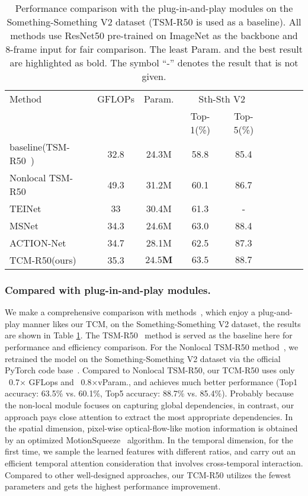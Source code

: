 \documentclass[journal]{IEEEtran}
\begin{document}
\begin{table}[!htbp]
\caption{Performance comparison with the plug-in-and-play modules on the Something-Something V2 dataset (TSM-R50 is used as a baseline). All methods use ResNet50 pre-trained on ImageNet as the backbone and 8-frame input for fair comparison. The least Param. and the best result are highlighted as bold. The symbol ``-” denotes the result that is not given.}
\label{tab:plugin}
\centering
\begin{tabular}{lcccccccc}
\hline
Method                           & GFLOPs & Param.           & \multicolumn{2}{c}{Sth-Sth V2}  \\
                                 &       &         & Top-1(\%)          & Top-5(\%)    \\ \hline
baseline(TSM-R50~\cite{lin2019tsm})            & 32.8    & 24.3M   & 58.8           & 85.4   \\ \hline
Nonlocal TSM-R50~\cite{lin2019tsm}           & 49.3    & 31.2M   & 60.1           & 86.7   \\
TEINet~\cite{liu2020teinet}      & 33  & 30.4M   & 61.3           & -                \\
MSNet~\cite{kwon2020motionsqueeze} & 34.3  & 24.6M   & 63.0   & 88.4 \\
ACTION-Net~\cite{wang2021action} & 34.7  & 28.1M   & 62.5   & 87.3 \\
TCM-R50(ours)  &     35.3  &   $\mathbf{24.5M}$        & $\mathbf{63.5}$           & $\mathbf{88.7}$                \\ \hline
\end{tabular}
\end{table}

\subsubsection{Compared with plug-in-and-play modules.}
We make a comprehensive comparison with methods~\cite{lin2019tsm,liu2020teinet,kwon2020motionsqueeze,wang2021action}, which enjoy a plug-and-play manner likes our TCM, on the Something-Something V2 dataset, the results are shown in Table \ref{tab:plugin}. The TSM-R50~\cite{lin2019tsm} method is served as the baseline here for performance and efficiency comparison. For the Nonlocal TSM-R50 method~\cite{lin2019tsm}, we retrained the model on the Something-Something V2 dataset via the official PyTorch code base~\cite{lin2019tsm}. Compared to Nonlocal TSM-R50, our TCM-R50 uses only ~0.7$\times$ GFLops and ~0.8$\times$vParam., and achieves much better performance (Top1 accuracy: 63.5\% vs. 60.1\%, Top5 accuracy: 88.7\% vs. 85.4\%). Probably because the non-local module focuses on capturing global dependencies, in contrast, our approach pays close attention to extract the most appropriate dependencies. In the spatial dimension, pixel-wise optical-flow-like motion information is obtained by an optimized MotionSqueeze~\cite{kwon2020motionsqueeze} algorithm. In the temporal dimension, for the first time, we sample the learned features with different ratios, and carry out an efficient temporal attention consideration that involves cross-temporal interaction. Compared to other well-designed approaches, our TCM-R50 utilizes the fewest parameters and gets the highest performance improvement.
\end{document}
